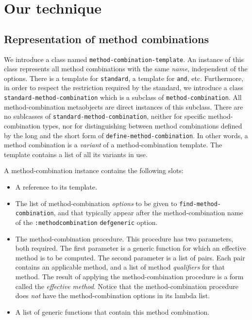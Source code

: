 \section{Our technique}

\subsection{Representation of method combinations}

We introduce a class named \texttt{method-combination-template}.  An
instance of this class represents all method combinations with the
same \emph{name}, independent of the options.  There is a template for
\texttt{standard}, a template for \texttt{and}, etc.  Furthermore, in
order to respect the restriction required by the standard, we
introduce a class \texttt{standard-method-combination} which is a
subclass of \texttt{method-combination}.  All method-combination
metaobjects are direct instances of this subclass.  There are no
sublcasses of \texttt{standard-method-combination}, neither for
specific method-combination types, nor for distinguishing between
method combinations defined by the long and the short form of
\texttt{define-method-combination}.  In other words, a method
combination is a \emph{variant} of a method-combination template.  The
template contains a list of all its variants in use.

A method-combination instance contains the following slots:

\begin{itemize}
\item A reference to its template.
\item The list of method-combination \emph{options} to be given to
  \texttt{find-method-combination}, and that typically appear after
  the method-combination name of the \texttt{:method\-combination}
  \texttt{defgeneric} option.
\item The method-combination procedure.  This procedure has two
  parameters, both required.  The first parameter is a generic
  function for which an effective method is to be computed.  The
  second parameter is a list of pairs.  Each pair contains an
  applicable method, and a list of method \emph{qualifiers} for that
  method.  The result of applying the method-combination procedure is
  a form called the \emph{effective method}.  Notice that the
  method-combination procedure does \emph{not} have the
  method-combination options in its lambda list.
\item A list of generic functions that contain this method combination.
\end{itemize}

